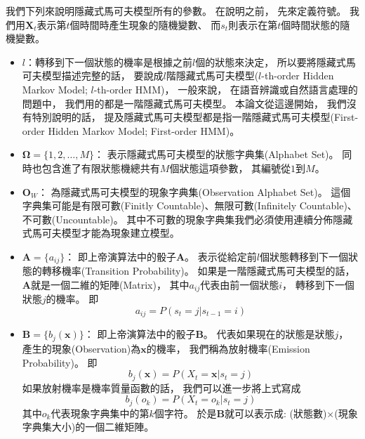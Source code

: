     我們下列來說明隱藏式馬可夫模型所有的參數。
    在說明之前，
    先來定義符號。
    我們用$\mathbf{X}_t$表示第$t$個時間時產生現象的隨機變數、
    而$s_t$則表示在第$t$個時間狀態的隨機變數。
    \begin{itemize}
      \item $l$：轉移到下一個狀態的機率是根據之前$l$個的狀態來決定，
	所以要將隱藏式馬可夫模型描述完整的話，
	要說成$l$階隱藏式馬可夫模型($l$-th-order Hidden Markov Model; $l$-th-order HMM)，
	一般來說，
	在語音辨識或自然語言處理的問題中，
	我們用的都是一階隱藏式馬可夫模型。
	本論文從這邊開始，
	我們沒有特別說明的話，
	提及隱藏式馬可夫模型都是指一階隱藏式馬可夫模型(First-order Hidden Markov Model; First-order HMM)。

      \item $\mathbf{\Omega} = \lbrace 1, 2, \ldots, M\rbrace$：
	表示隱藏式馬可夫模型的狀態字典集(Alphabet Set)。
	同時也包含進了有限狀態機總共有$M$個狀態這項參數，
	其編號從$1$到$M$。

      \item $\mathbf{O}_W$： 
	為隱藏式馬可夫模型的現象字典集(Observation Alphabet Set)。
	這個字典集可能是有限可數(Finitly Countable)、無限可數(Infinitely Countable)、不可數(Uncountable)。
	其中不可數的現象字典集我們必須使用連續分佈隱藏式馬可夫模型才能為現象建立模型。

      \item $\mathbf{A} = \lbrace a_{ij} \rbrace$：
	即上帝演算法中的骰子$\mathbf{A}$。
	表示從給定前$l$個狀態轉移到下一個狀態的轉移機率(Transition Probability)。
	如果是一階隱藏式馬可夫模型的話，
	$\mathbf{A}$就是一個二維的矩陣(Matrix)，
	其中$a_{ij}$代表由前一個狀態$i$，
	轉移到下一個狀態$j$的機率。
	即
	\begin{equation}
	  a_{ij} = P(s_t = j | s_{t-1} = i)
	\end{equation}

      \item $\mathbf{B} = \lbrace b_j(\mathbf{x}) \rbrace$：
	即上帝演算法中的骰子$\mathbf{B}$。
	代表如果現在的狀態是狀態$j$，
	產生的現象(Observation)為$\mathbf{x}$的機率，
	我們稱為放射機率(Emission Probability)。
	即
	\begin{equation}
	  b_j(\mathbf{x}) = P(X_t = \mathbf{x} | s_t = j)
	\end{equation}
	如果放射機率是機率質量函數的話，
	我們可以進一步將上式寫成
	\begin{equation}
	  b_j(o_k) = P(X_t = o_k | s_t = j)
	\end{equation}
	其中$o_k$代表現象字典集中的第$k$個字符。
	於是$\mathbf{B}$就可以表示成: (狀態數)$\times$(現象字典集大小)的一個二維矩陣。


\end{itemize}
